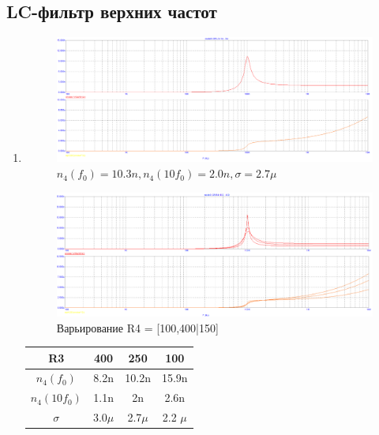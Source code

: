 \documentclass[a4paper, 12pt]{article}%
\begin{document}
\subsection*{LC-фильтр верхних частот}

\begin{enumerate}

\item

\begin{figure}[h!]
    \centering
    \includegraphics[scale=0.3]{images/mod3_4_1.png}
    \caption{$n_4(f_0) = 10.3n, n_4(10 f_0) = 2.0n, \sigma = 2.7\mu$}
    \label{fig:m341}
\end{figure}

\begin{figure}[h!]
    \centering
    \includegraphics[scale=0.3]{images/mod3_4_2_1.png}
    \caption{Варьирование R4 = [100,400|150]}
    \label{fig:m3421}
\end{figure}

\begin{center}
\begin{tabular}{|c|c|c|c|}
\hline
    R3 & 400 & 250 & 100\\ \hline
    $n_4(f_0)$ & 8.2n & 10.2n & 15.9n\\ \hline
    $n_4(10 f_0)$ & 1.1n & 2n & 2.6n\\ \hline
    $\sigma$ & 3.0$\mu$ & 2.7$\mu$ & 2.2 $\mu$ \\ \hline
\end{tabular}
\end{center}


\end{enumerate}
\end{document}
